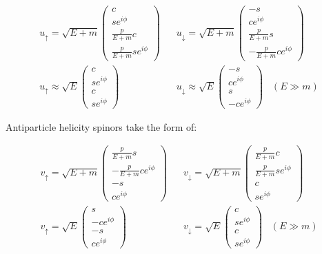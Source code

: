 \documentclass[10pt]{article}
\theoremstyle{definition}
\begin{document}
\begin{align*}
    u_{\uparrow} = \sqrt{E+m}\begin{pmatrix}
        c\\
        se^{i\phi}\\
        \frac{p}{E+m}c\\
        \frac{p}{E+m}se^{i\phi}
    \end{pmatrix}
    \;\;\;&
    u_{\downarrow} = \sqrt{E+m}\begin{pmatrix}
        -s\\
        ce^{i\phi}\\
        \frac{p}{E+m}s\\
        -\frac{p}{E+m}ce^{i\phi}
    \end{pmatrix}\\
    u_{\uparrow} \approx \sqrt{E}\begin{pmatrix}
        c\\
        se^{i\phi}\\
        c\\
        se^{i\phi}
    \end{pmatrix}
    \;\;\;&
    u_{\downarrow} \approx \sqrt{E}\begin{pmatrix}
        -s\\
        ce^{i\phi}\\
        s\\
        -ce^{i\phi}
    \end{pmatrix}
    \;\;\; (E \gg m)
\end{align*}

Antiparticle helicity spinors take the form of:

\begin{align*}
    v_{\uparrow} = \sqrt{E+m}\begin{pmatrix}
        \frac{p}{E+m}s\\
        -\frac{p}{E+m}ce^{i\phi}\\
        -s\\
        ce^{i\phi}
    \end{pmatrix}
    \;\;\;&
    v_{\downarrow} = \sqrt{E+m}\begin{pmatrix}
        \frac{p}{E+m}c\\
        \frac{p}{E+m}se^{i\phi}\\
        c\\
        se^{i\phi}
    \end{pmatrix}\\
    v_{\uparrow} = \sqrt{E}\begin{pmatrix}
        s\\
        -ce^{i\phi}\\
        -s\\
        ce^{i\phi}
    \end{pmatrix}
    \;\;\;&
    v_{\downarrow} = \sqrt{E}\begin{pmatrix}
        c\\
        se^{i\phi}\\
        c\\
        se^{i\phi}
    \end{pmatrix}
    \;\;\; (E \gg m)
\end{align*}


%
\end{document}

